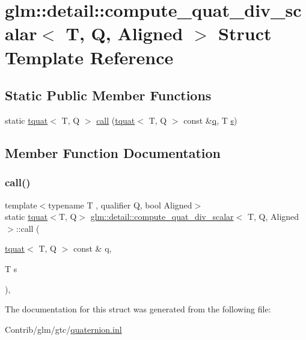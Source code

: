 \hypertarget{structglm_1_1detail_1_1compute__quat__div__scalar}{}\section{glm\+:\+:detail\+:\+:compute\+\_\+quat\+\_\+div\+\_\+scalar$<$ T, Q, Aligned $>$ Struct Template Reference}
\label{structglm_1_1detail_1_1compute__quat__div__scalar}
\subsection*{Static Public Member Functions}
\begin{DoxyCompactItemize}
\item 
static \mbox{\hyperlink{structglm_1_1tquat}{tquat}}$<$ T, Q $>$ \mbox{\hyperlink{structglm_1_1detail_1_1compute__quat__div__scalar_a669dfccba8f8cbe2d8309c09b939996e}{call}} (\mbox{\hyperlink{structglm_1_1tquat}{tquat}}$<$ T, Q $>$ const \&\mbox{\hyperlink{_s_d_l__opengl_8h_a8fc1e7b9baaae687804c7eed46ca09c6}{q}}, T \mbox{\hyperlink{_s_d_l__opengl_8h_a4af680a6c683f88ed67b76f207f2e6e4}{s}})
\end{DoxyCompactItemize}


\subsection{Member Function Documentation}
\mbox{\label{structglm_1_1detail_1_1compute__quat__div__scalar_a669dfccba8f8cbe2d8309c09b939996e}} 
\subsubsection{\texorpdfstring{call()}{call()}}
{\footnotesize\ttfamily template$<$typename T , qualifier Q, bool Aligned$>$ \\
static \mbox{\hyperlink{structglm_1_1tquat}{tquat}}$<$T, Q$>$ \mbox{\hyperlink{structglm_1_1detail_1_1compute__quat__div__scalar}{glm\+::detail\+::compute\+\_\+quat\+\_\+div\+\_\+scalar}}$<$ T, Q, Aligned $>$\+::call (\begin{DoxyParamCaption}\item[{\mbox{\hyperlink{structglm_1_1tquat}{tquat}}$<$ T, Q $>$ const \&}]{q,  }\item[{T}]{s }\end{DoxyParamCaption})\hspace{0.3cm}{\ttfamily [inline]}, {\ttfamily [static]}}



The documentation for this struct was generated from the following file\+:\begin{DoxyCompactItemize}
\item 
Contrib/glm/gtc/\mbox{\hyperlink{gtc_2quaternion_8inl}{quaternion.\+inl}}\end{DoxyCompactItemize}
